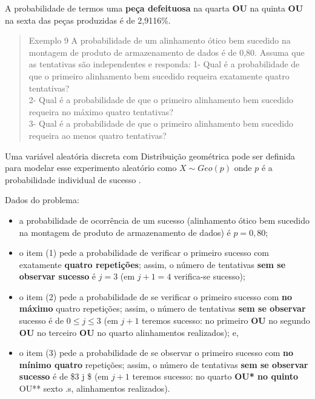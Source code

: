 \documentclass[
]{book}
\providecommand{\tightlist}{%
  \setlength{\itemsep}{0pt}\setlength{\parskip}{0pt}}
\begin{document}
\hfill\break

A probabilidade de termos uma \textbf{peça defeituosa} na quarta \textbf{OU} na quinta \textbf{OU} na sexta das peças produzidas é de 2,9116\%.

\hfill\break

\begin{quote}
Exemplo 9 A probabilidade de um alinhamento ótico bem sucedido na montagem de produto de armazenamento de dados é de 0,80. Assuma que as tentativas são independentes e responda:
1- Qual é a probabilidade de que o primeiro alinhamento bem sucedido requeira exatamente quatro tentativas?\\
2- Qual é a probabilidade de que o primeiro alinhamento bem sucedido requeira no máximo quatro tentativas?\\
3- Qual é a probabilidade de que o primeiro alinhamento bem sucedido requeira ao menos quatro tentativas?
\end{quote}

\hfill\break

Uma variável aleatória discreta com Distribuição geométrica pode ser definida para modelar esse experimento aleatório como \(X\sim Geo(p)\) onde \(p\) é a probabilidade individual de sucesso .

\hfill\break

Dados do problema:

\begin{itemize}
\tightlist
\item
  a probabilidade de ocorrência de um sucesso (alinhamento ótico bem sucedido na montagem de produto de armazenamento de dados) é \(p=0,80\);\\
\item
  o item (1) pede a probabilidade de verificar o primeiro sucesso com exatamente \textbf{quatro repetições}; assim, o número de tentativas \textbf{sem se observar sucesso} é \(j=3\) (em \(j+1=4\) verifica-se sucesso);\\
\item
  o item (2) pede a probabilidade de se verificar o primeiro sucesso com \textbf{no máximo} quatro repetições; assim, o número de tentativas \textbf{sem se observar} sucesso é de \(0 \le j \le 3\) (em \(j+1\) teremos sucesso: no primeiro \textbf{OU} no segundo \textbf{OU} no terceiro \textbf{OU} no quarto alinhamentos realizados); e,\\
\item
  o item (3) pede a probabilidade de se observar o primeiro sucesso com \textbf{no mínimo quatro} repetições; assim, o número de tentativas \textbf{sem se observar sucesso} é de \$3 \le j \le \infty \$ (em \(j+1\) teremos sucesso: no quarto \textbf{OU* no quinto }OU** sexto .s, alinhamentos realizados).
\end{itemize}
\end{document}
